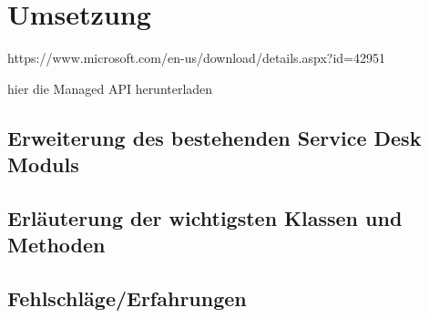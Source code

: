 \section{Umsetzung}
https://www.microsoft.com/en-us/download/details.aspx?id=42951

hier die Managed API herunterladen
\subsection{Erweiterung des bestehenden Service Desk Moduls}
\subsection{Erläuterung der wichtigsten Klassen und Methoden}
\subsection{Fehlschläge/Erfahrungen}